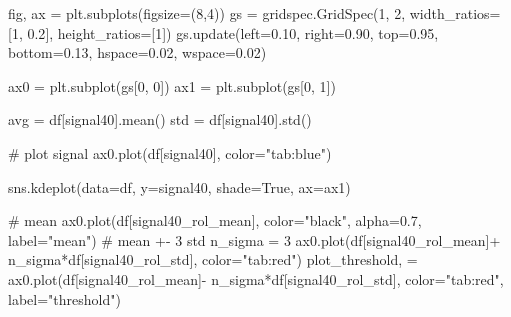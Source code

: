 \documentclass[
  letterpaper,
  DIV=11,
  numbers=noendperiod,
  oneside]{scrreprt}
\newenvironment{Shaded}{\begin{snugshade}}{\end{snugshade}}
\newcommand{\CommentTok}[1]{\textcolor[rgb]{0.37,0.37,0.37}{#1}}
\newcommand{\DecValTok}[1]{\textcolor[rgb]{0.68,0.00,0.00}{#1}}
\newcommand{\FloatTok}[1]{\textcolor[rgb]{0.68,0.00,0.00}{#1}}
\newcommand{\NormalTok}[1]{\textcolor[rgb]{0.00,0.23,0.31}{#1}}
\newcommand{\OperatorTok}[1]{\textcolor[rgb]{0.37,0.37,0.37}{#1}}
\newcommand{\StringTok}[1]{\textcolor[rgb]{0.13,0.47,0.30}{#1}}
\newcommand{\VariableTok}[1]{\textcolor[rgb]{0.07,0.07,0.07}{#1}}
\begin{document}
\begin{Shaded}
\begin{Highlighting}[]
\NormalTok{fig, ax }\OperatorTok{=}\NormalTok{ plt.subplots(figsize}\OperatorTok{=}\NormalTok{(}\DecValTok{8}\NormalTok{,}\DecValTok{4}\NormalTok{))}
\NormalTok{gs }\OperatorTok{=}\NormalTok{ gridspec.GridSpec(}\DecValTok{1}\NormalTok{, }\DecValTok{2}\NormalTok{, width\_ratios}\OperatorTok{=}\NormalTok{[}\DecValTok{1}\NormalTok{, }\FloatTok{0.2}\NormalTok{], height\_ratios}\OperatorTok{=}\NormalTok{[}\DecValTok{1}\NormalTok{])}
\NormalTok{gs.update(left}\OperatorTok{=}\FloatTok{0.10}\NormalTok{, right}\OperatorTok{=}\FloatTok{0.90}\NormalTok{, top}\OperatorTok{=}\FloatTok{0.95}\NormalTok{, bottom}\OperatorTok{=}\FloatTok{0.13}\NormalTok{,}
\NormalTok{          hspace}\OperatorTok{=}\FloatTok{0.02}\NormalTok{, wspace}\OperatorTok{=}\FloatTok{0.02}\NormalTok{)}

\NormalTok{ax0 }\OperatorTok{=}\NormalTok{ plt.subplot(gs[}\DecValTok{0}\NormalTok{, }\DecValTok{0}\NormalTok{])}
\NormalTok{ax1 }\OperatorTok{=}\NormalTok{ plt.subplot(gs[}\DecValTok{0}\NormalTok{, }\DecValTok{1}\NormalTok{])}

\NormalTok{avg }\OperatorTok{=}\NormalTok{ df[}\StringTok{\textquotesingle{}signal40\textquotesingle{}}\NormalTok{].mean()}
\NormalTok{std }\OperatorTok{=}\NormalTok{ df[}\StringTok{\textquotesingle{}signal40\textquotesingle{}}\NormalTok{].std()}

\CommentTok{\# plot signal}
\NormalTok{ax0.plot(df[}\StringTok{\textquotesingle{}signal40\textquotesingle{}}\NormalTok{], color}\OperatorTok{=}\StringTok{"tab:blue"}\NormalTok{)}

\NormalTok{sns.kdeplot(data}\OperatorTok{=}\NormalTok{df, y}\OperatorTok{=}\StringTok{\textquotesingle{}signal40\textquotesingle{}}\NormalTok{, shade}\OperatorTok{=}\VariableTok{True}\NormalTok{, ax}\OperatorTok{=}\NormalTok{ax1)}

\CommentTok{\# mean}
\NormalTok{ax0.plot(df[}\StringTok{\textquotesingle{}signal40\_rol\_mean\textquotesingle{}}\NormalTok{], color}\OperatorTok{=}\StringTok{"black"}\NormalTok{, alpha}\OperatorTok{=}\FloatTok{0.7}\NormalTok{, label}\OperatorTok{=}\StringTok{"mean"}\NormalTok{)}
\CommentTok{\# mean +{-} 3 std}
\NormalTok{n\_sigma }\OperatorTok{=} \DecValTok{3}
\NormalTok{ax0.plot(df[}\StringTok{\textquotesingle{}signal40\_rol\_mean\textquotesingle{}}\NormalTok{]}\OperatorTok{+}\NormalTok{ n\_sigma}\OperatorTok{*}\NormalTok{df[}\StringTok{\textquotesingle{}signal40\_rol\_std\textquotesingle{}}\NormalTok{], color}\OperatorTok{=}\StringTok{"tab:red"}\NormalTok{)}
\NormalTok{plot\_threshold, }\OperatorTok{=}\NormalTok{ ax0.plot(df[}\StringTok{\textquotesingle{}signal40\_rol\_mean\textquotesingle{}}\NormalTok{]}\OperatorTok{{-}}\NormalTok{ n\_sigma}\OperatorTok{*}\NormalTok{df[}\StringTok{\textquotesingle{}signal40\_rol\_std\textquotesingle{}}\NormalTok{],}
\NormalTok{                           color}\OperatorTok{=}\StringTok{"tab:red"}\NormalTok{, label}\OperatorTok{=}\StringTok{"threshold"}\NormalTok{)}


\end{Highlighting}
\end{Shaded}
\end{document}

